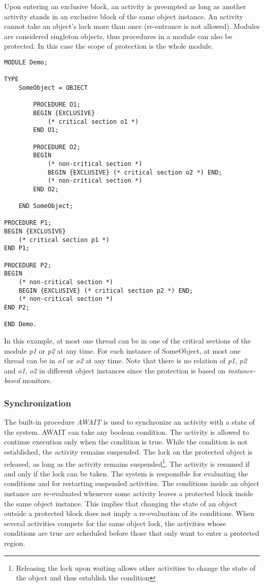 \documentclass[a4paper,11pt]{article}
\begin{document}
Upon entering an exclusive block, an activity is preempted as long as another activity stands in an exclusive block
of the same object instance. An activity cannot take an object's lock more than once (re-entrance is not allowed).
Modules are considered singleton objects, thus procedures in a module can also be protected. In this case the scope of protection is the whole module.

\begin{lstlisting}[language=Oberon,frame=none,caption=Usage of exclusive blocks]
MODULE Demo;

TYPE
    SomeObject = OBJECT

        PROCEDURE O1;
        BEGIN {EXCLUSIVE}
            (* critical section o1 *)
        END O1;

        PROCEDURE O2;
        BEGIN
            (* non-critical section *)
            BEGIN {EXCLUSIVE} (* critical section o2 *) END;
            (* non-critical section *)
        END O2;

    END SomeObject;

PROCEDURE P1;
BEGIN {EXCLUSIVE}
    (* critical section p1 *)
END P1;

PROCEDURE P2;
BEGIN
    (* non-critical section *)
    BEGIN {EXCLUSIVE} (* critical section p2 *) END;
    (* non-critical section *)
END P2;

END Demo.
\end{lstlisting}

In this example, at most one thread can be in one of the critical sections of the module \emph{p1} or \emph{p2} at any time. For each instance of SomeObject, at most one thread can be in \emph{o1} or \emph{o2} at any time. Note that there is no relation of \emph{p1}, \emph{p2} and \emph{o1}, \emph{o2} in different object instances since the protection is based on \emph{instance-based} monitors.

\subsubsection{Synchronization}
The built-in procedure {\em AWAIT} is used to synchronize an activity with a state of the system. AWAIT can take any boolean condition. The activity is allowed to continue execution only when the condition is true. While the condition is not established, the activity remains suspended. The lock on the protected object is released, as long as the activity remains suspended\footnote{Releasing the lock upon waiting allows other activities to change the state of the object and thus establish the condition}. The activity is resumed if and only if the lock can be taken. The system is responsible for evaluating the conditions and for restarting suspended activities. The conditions inside an object instance are re-evaluated whenever some activity leaves a protected block inside the same object instance.
This implies that changing the state of an object outside a protected block does not imply a re-evaluation of its conditions.
When several activities compete for the same object lock, the activities whose conditions are true are scheduled before those that only want to enter a protected region.
\end{document}
